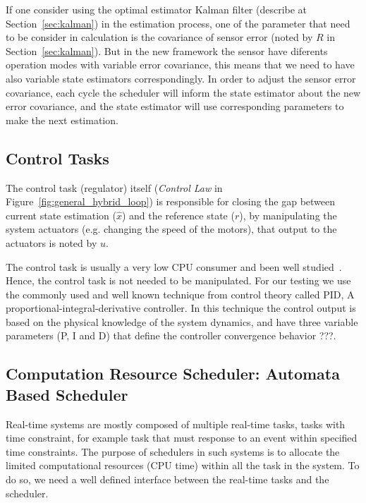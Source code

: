 \documentclass[ twoside, 12pt ]{article}
\begin{document}
{If one consider using the optimal estimator Kalman filter (describe at Section~\ref{sec:kalman}) in the estimation process, one of the parameter that need to be consider in calculation is the covariance of sensor error (noted by $R$ in Section~\ref{sec:kalman}).
But in the new framework the sensor have diferents operation modes with variable error covariance, this means that we need to have also variable state estimators correspondingly.
In order to adjust the sensor error covariance, each cycle the scheduler will inform the state estimator about the new error covariance, and the state estimator will use corresponding parameters to make the next estimation.

\subsection{Control Tasks} 
\label{sec:control} 
The control task (regulator) itself (\textit{Control Law} in Figure~\ref{fig:general_hybrid_loop}) is responsible for closing the gap between current state estimation ($\hat{x}$) and the reference state ($r$), by manipulating the system actuators (e.g. changing the speed of the motors), that output to the actuators is noted by $u$.

The control task is usually a very low CPU consumer and been well studied~\cite{Bennett,Cervin}. Hence, the control task is not needed to be manipulated.
For our testing we use the commonly used and well known technique from control theory called PID, A proportional-integral-derivative controller.
In this technique the control output is based on the physical knowledge of the system dynamics, and have three variable parameters (P, I and D) that define the controller convergence behavior \cite{PID} ???.

\subsection{Computation Resource Scheduler: Automata Based Scheduler}
\label{sec:scheduler}

Real-time systems are mostly composed of multiple real-time tasks, tasks with time constraint, for example task that must response to an event within specified time constraints.
The purpose of schedulers in such systems is to allocate the limited computational resources (CPU time) within all the task in the system. To do so, we need a well defined interface between the real-time tasks and the scheduler.

}
\end{document}
